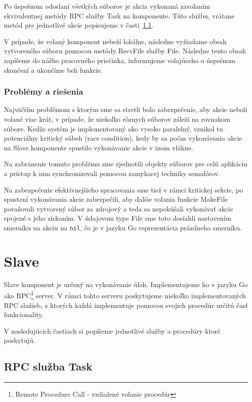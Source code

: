 Po úspešnom odoslaní všetkých súborov je akcia vykonaná zavolaním ekvivalentnej metódy
RPC služby Task na komponente. Túto službu, vrátane metód pre jednotlivé akcie popisujeme
v časti~\ref{sec:slave:rpc:task}.

V prípade, že volaný komponent nebeží lokálne, následne vyžiadame obsah vytvoreného
súboru pomocou metódy RecvFile služby File. Následne tento obsah zapíšeme do nášho
pracovného priečinka, informujeme volajúceho o úspešnom skončení a ukončíme beh funkcie.

\subsubsection{Problémy a riešenia}

Najväčším problémom s ktorým sme sa stretli bolo zabezpečenie, aby akcie neboli
volané viac krát, v prípade, že niekoľko rôznych súborov záleží na rovnakom
súbore. Kedže systém je implementovaný ako vysoko paralelný, vznikol tu potenciálny
kritický súbeh (race condition), kedy by sa počas vykonávania akcie na Slave komponente
spustilo vykonávanie akcie v inom vlákne.

Na zabránenie tomuto problému sme zjednotili objekty súborov pre celú aplikáciu a prístup
k nim synchronizovali pomocou zamykacej techniky semafórov.

Na zabezpečenie efektívnejšieho spracovania sme tiež v rámci kritickej sekcie, po spustení
vykonávania akcie zabezpečili, aby ďalšie volania funkcie MakeFile považovali vytvorený
súbor za zdrojový a teda sa nepokúšali vykonávať akcie spojené s jeho získaním. V údajovom
type File sme toto dosiahli nastavením smerníku na akciu na \texttt{nil}, čo je v jazyku
Go reprezentácia prázdneho smerníku.

\section{Slave}
\label{sec:slave}

Slave komponent je určený na vykonávanie úloh. Implementujeme ho v jazyku Go
ako RPC\footnote{Remote Procedure Call - vzdialené volanie procedúr} server.
V rámci tohto serveru poskytujeme niekoľko implementovaných RPC služieb,
z ktorých každá implementuje pomocou svojich procedúr určitú časť funkcionality.

V nasledujúcich častiach si popíšeme jednotlivé služby a procedúry ktoré
poskytujú.

\subsection{RPC služba Task}
    \label{sec:slave:rpc:task}


